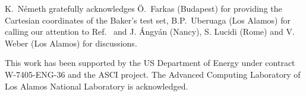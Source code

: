 \documentclass[prl,aps,preprint,showpacs,superbib]{revtex4}
\begin{document}
\begin{acknowledgments}
K.~N{\'e}meth gratefully acknowledges {\"{O}}.~Farkas (Budapest) for providing the 
Cartesian coordinates of the Baker's test set,  B.P.~Uberuaga (Los Alamos) for 
calling our attention to Ref.~\cite{force-matching} and  J. {\'A}ngy{\'a}n
(Nancy), S. Lucidi (Rome) and V. Weber (Los Alamos) for discussions.

This work has been supported by the US Department of Energy 
under contract W-7405-ENG-36 and the ASCI project.  
The Advanced Computing Laboratory of Los 
Alamos National Laboratory is acknowledged.
\end{acknowledgments}



\commentoutB{

\clearpage


}
\end{document}
